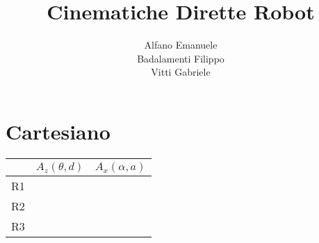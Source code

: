 \documentclass[a4paper,11pt]{article}
\author{Alfano Emanuele \\ Badalamenti Filippo \\ Vitti Gabriele}
\newcommand{\DHTable}{
	\begin{tabular}{c|c|c|c|c|}
		\cline{2-5} &
		\multicolumn{2}{|c|}{$A_z(\theta,d)$} &
		\multicolumn{2}{|c|}{$A_x(\alpha,a)$} \\
		\hline
		\multicolumn{1}{|c|}{R1} &  &  &  &  \\
		\hline
		\multicolumn{1}{|c|}{R2} &  &  &  &  \\
		\hline
		\multicolumn{1}{|c|}{R3} &  &  &  &  \\
		\hline
	\end{tabular}
}
\begin{document}
\title{Cinematiche Dirette Robot}
\maketitle
\pagebreak

\section*{Cartesiano}
\DHTable
\end{document}
